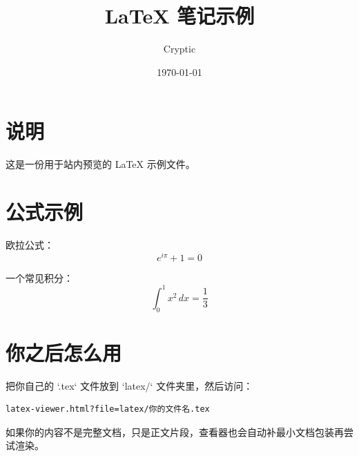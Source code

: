 \documentclass{article}
\title{LaTeX 笔记示例}
\author{Cryptic}
\date{\today}
\begin{document}
\maketitle

\section{说明}

这是一份用于站内预览的 \LaTeX{} 示例文件。

\section{公式示例}

欧拉公式：
\[
e^{i\pi} + 1 = 0
\]

一个常见积分：
\[
\int_0^1 x^2 \, dx = \frac{1}{3}
\]

\section{你之后怎么用}

把你自己的 `.tex` 文件放到 `latex/` 文件夹里，然后访问：

\begin{verbatim}
latex-viewer.html?file=latex/你的文件名.tex
\end{verbatim}

如果你的内容不是完整文档，只是正文片段，查看器也会自动补最小文档包装再尝试渲染。
\end{document}
